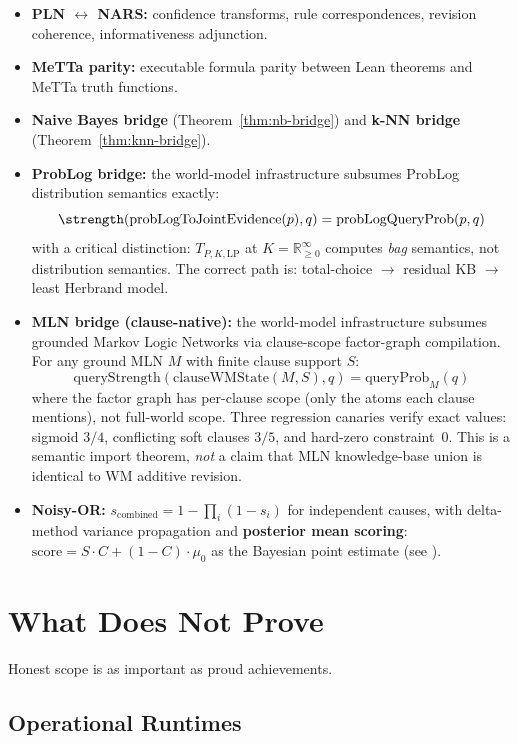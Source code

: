 \documentclass[11pt,openany]{report}
\begin{document}
\begin{itemize}
\item \textbf{PLN $\leftrightarrow$ NARS:} confidence transforms, rule
  correspondences, revision coherence, informativeness adjunction.
\item \textbf{MeTTa parity:} executable formula parity between Lean
  theorems and MeTTa truth functions.
\item \textbf{Naive Bayes bridge} (Theorem~\ref{thm:nb-bridge}) and
  \textbf{k-NN bridge} (Theorem~\ref{thm:knn-bridge}).
\item \textbf{ProbLog bridge:} the world-model infrastructure subsumes
  ProbLog distribution semantics exactly:
  \[
    \strength(\mathrm{probLogToJointEvidence}(p), q) = \mathrm{probLogQueryProb}(p, q)
  \]
  with a critical distinction: $T_{P,K,\mathrm{LP}}$ at $K = \mathbb{R}_{\ge 0}^\infty$
  computes \emph{bag} semantics, not distribution semantics.
  The correct path is: total-choice $\to$ residual KB $\to$ least Herbrand model.
\item \textbf{MLN bridge (clause-native):} the world-model infrastructure
  subsumes grounded Markov Logic Networks via clause-scope factor-graph
  compilation.  For any ground MLN $M$ with finite clause support $S$:
  \[
    \mathrm{queryStrength}(\mathrm{clauseWMState}(M, S), q)
      = \mathrm{queryProb}_{M}(q)
  \]
  where the factor graph has per-clause scope (only the atoms each clause
  mentions), not full-world scope.  Three regression canaries verify
  exact values: sigmoid $3/4$, conflicting soft clauses $3/5$, and
  hard-zero constraint~$0$.
  This is a semantic import theorem, \emph{not} a claim that MLN
  knowledge-base union is identical to WM additive revision.
\item \textbf{Noisy-OR:} $s_{\mathrm{combined}} = 1 - \prod_{i}(1 - s_i)$
  for independent causes, with delta-method variance propagation and
  \textbf{posterior mean scoring}:
  $\mathrm{score} = S \cdot C + (1 - C) \cdot \mu_0$ as the Bayesian
  point estimate (see ).
\end{itemize}


\chapter{What \xiPLN{} Does Not Prove}
\label{ch:what-not-proved}

Honest scope is as important as proud achievements.

\section{Operational Runtimes}
\end{document}
